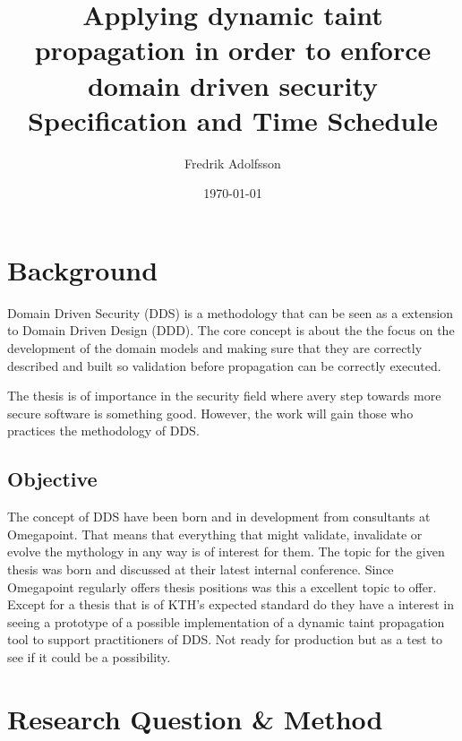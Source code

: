\documentclass{../kththesis}
\title{Applying dynamic taint propagation in order to enforce domain driven security \\
        \large Specification and Time Schedule}
\author{Fredrik Adolfsson}
\date{\today}
\begin{document}
\frontmatter


\titlepage


\tableofcontents


\mainmatter



\chapter{Background}

Domain Driven Security (DDS) is a methodology that can be seen as a extension to Domain Driven Design (DDD). The core concept is about the the focus on the development of the domain models  and making sure that they are correctly described and built so validation before propagation can be correctly executed.

The thesis is of importance in the security field where avery step towards more secure software is something good. However, the work will gain those who practices the methodology of DDS.


\section{Objective}

The concept of DDS have been born and in development from consultants at Omegapoint. That means that everything that might validate, invalidate or evolve the mythology in any way is of interest for them. The topic for the given thesis was born and discussed at their latest internal conference. Since Omegapoint regularly offers thesis positions was this a excellent topic to offer. Except for a thesis that is of KTH's expected standard do they have a interest in seeing a prototype of a possible implementation of a dynamic taint propagation tool to support practitioners of DDS. Not ready for production but as a test to see if it could be a possibility.

\chapter{Research Question \& Method}
\end{document}
